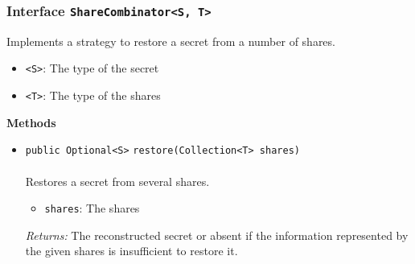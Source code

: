 \subsubsection{Interface \lstinline|ShareCombinator<S, T>|}
Implements a strategy to restore a secret from a number of shares. \\
\noindent\begin{minipage}[t]{5cm}
\vspace{0.3em}
\hspace*{2em}
\vspace{0.3em}
\end{minipage}

\begin{itemize}
\item \lstinline|<S>|: The type of the secret
\item \lstinline|<T>|: The type of the shares
\end{itemize}




\textbf{\sffamily Methods}
\begin{itemize}
\item \lstinline|public Optional<S>| \lstinline|restore|\lstinline|(Collection<T> shares)|\\ \\[-0.6em]
Restores a secret from several shares.
\begin{itemize}
\item \lstinline|shares|: The shares
\end{itemize}

\emph{Returns:} The reconstructed secret or absent if the information represented
 by the given shares is insufficient to restore it.

\end{itemize}


